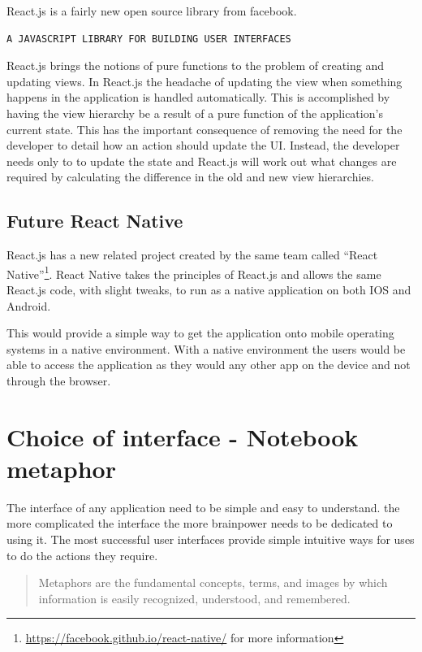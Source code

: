 React.js is a fairly new open source library from facebook.

\begin{verbatim}
A JAVASCRIPT LIBRARY FOR BUILDING USER INTERFACES
\end{verbatim}\cite{reactjs}

React.js brings the notions of pure functions to the problem of creating and
updating views. In React.js the headache of updating the view when something
happens in the application is handled automatically. This is accomplished by
having the view hierarchy be a result of a pure function of the application's
current state. This has the important consequence of removing the need for the
developer to detail how an action should update the UI. Instead, the developer
needs only to to update the state and React.js will work out what changes are
required by calculating the difference in the old and new view hierarchies.

\subsection{Future React Native}\label{future-react-native}

React.js has a new related project created by the same team called ``React
Native''\footnote{\url{https://facebook.github.io/react-native/} for more
information}. React Native takes the principles of React.js and allows the same
React.js code, with slight tweaks, to run as a native application on both IOS
and Android.

This would provide a simple way to get the application onto mobile operating systems in a
native environment. With a native environment the users would be able to access the application
as they would any other app on the device and not through the browser.

\section{Choice of interface - Notebook
metaphor}\label{choice-of-interface---notebook-metaphor}

The interface of any application need to be simple and easy to
understand. the more complicated the interface the more brainpower needs
to be dedicated to using it. The most successful user interfaces provide
simple intuitive ways for uses to do the actions they require.

\blockquote{%
  Metaphors are the fundamental concepts, terms, and images by which information
  is easily recognized, understood, and remembered.%
}

